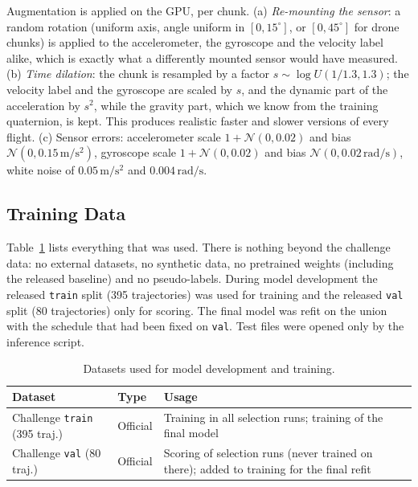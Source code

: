 \documentclass[letterpaper,10pt,conference]{ieeeconf}
\begin{document}
Augmentation is applied on the GPU, per chunk. (a) \emph{Re-mounting the sensor}: a random rotation (uniform axis,
angle uniform in $[0, 15^\circ]$, or $[0, 45^\circ]$ for drone chunks) is applied to the accelerometer, the
gyroscope and the velocity label alike, which is exactly what a differently mounted sensor would have measured.
(b) \emph{Time dilation}: the chunk is resampled by a factor $s\sim\log U(1/1.3, 1.3)$; the velocity label and the
gyroscope are scaled by $s$, and the dynamic part of the acceleration by $s^2$, while the gravity part, which we
know from the training quaternion, is kept. This produces realistic faster and slower versions of every flight.
(c) Sensor errors: accelerometer scale $1+\mathcal N(0,0.02)$ and bias $\mathcal N(0, 0.15\,\mathrm{m/s^2})$,
gyroscope scale $1+\mathcal N(0,0.02)$ and bias $\mathcal N(0, 0.02\,\mathrm{rad/s})$, white noise of
$0.05\,\mathrm{m/s^2}$ and $0.004\,\mathrm{rad/s}$.

\subsection{Training Data}
Table~\ref{tab:datasets} lists everything that was used. There is nothing beyond the challenge data: no external
datasets, no synthetic data, no pretrained weights (including the released baseline) and no pseudo-labels. During
model development the released \texttt{train} split (395 trajectories) was used for training and the released
\texttt{val} split (80 trajectories) only for scoring. The final model was refit on the union with the schedule
that had been fixed on \texttt{val}. Test files were opened only by the inference script.
\begin{table}[htbp]
    \centering\footnotesize
    \caption{Datasets used for model development and training.}
    \begin{tabular}{p{2.3cm} p{1.5cm} p{3.6cm}}
        \toprule Dataset & Type & Usage \\ \midrule
        Challenge \texttt{train} (395 traj.) & Official & Training in all selection runs; training of the final model \\
        Challenge \texttt{val} (80 traj.) & Official & Scoring of selection runs (never trained on there); added to training for the final refit \\
        \bottomrule
    \end{tabular}
    \label{tab:datasets}
\end{table}
\end{document}
